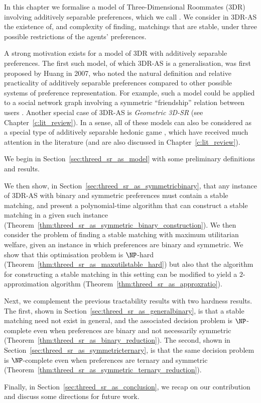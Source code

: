 In this chapter we formalise a model of Three-Dimensional Roommates (3DR) involving additively separable preferences, which we call . We consider in 3DR-AS the existence of, and complexity of finding, matchings that are stable, under three possible restrictions of the agents' preferences.

A strong motivation exists for a model of 3DR with additively separable preferences. The first such model, of which 3DR-AS is a generalisation, was first proposed by Huang \cite{Huang07conference} in 2007, who noted the natural definition and relative practicality of additively separable preferences compared to other possible systems of preference representation. For example, such a model could be applied to a social network graph involving a symmetric ``friendship'' relation between users \cite{Sless18}. Another special case of 3DR-AS is \emph{Geometric 3D-SR} \cite{ABEOMP09} (see Chapter~\ref{c:lit_review}). In a sense, all of these models can also be considered as a special type of additively separable hedonic game \cite{AZIZ2013316,SUNG2010635}, which have received much attention in the literature (and are also discussed in Chapter~\ref{c:lit_review}).

We begin in Section~\ref{sec:threed_sr_as_model} with some preliminary definitions and results. 

We then show, in Section~\ref{sec:threed_sr_as_symmetricbinary}, that any instance of 3DR-AS with binary and symmetric preferences must contain a stable matching, and present a polynomial-time algorithm that can construct a stable matching in a given such instance (Theorem~\ref{thm:threed_sr_as_symmetric_binary_construction}). We then consider the problem of finding a stable matching with maximum utilitarian welfare, given an instance in which preferences are binary and symmetric. We show that this optimisation problem is $\NP$-hard (Theorem~\ref{thm:threed_sr_as_maxutilstable_hard}) but also that the algorithm for constructing a stable matching in this setting can be modified to yield a $2$-approximation algorithm (Theorem~\ref{thm:threed_sr_as_approxratio}).

Next, we complement the previous tractability results with two hardness results. The first, shown in Section~\ref{sec:threed_sr_as_generalbinary}, is that a stable matching need not exist in general, and the associated decision problem is $\NP$-complete even when preferences are binary and not necessarily symmetric (Theorem~\ref{thm:threed_sr_as_binary_reduction}). The second, shown in Section~\ref{sec:threed_sr_as_symmetricternary}, is that the same decision problem is $\NP$-complete even when preferences are ternary and symmetric (Theorem~\ref{thm:threed_sr_as_symmetric_ternary_reduction}).

Finally, in Section~\ref{sec:threed_sr_as_conclusion}, we recap on our contribution and discuss some directions for future work.